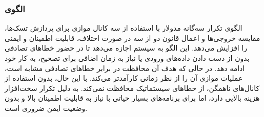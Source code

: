 \subsubsection{الگوی }
\label{archSafeTripModRedunSec}
\begin{RTL}
الگوی تکرار سه‌گانه مدولار  با استفاده از سه کانال
موازی برای پردازش تسک‌ها، مقایسه خروجی‌ها و اعمال قانون دو از سه
در صورت اختلاف، قابلیت اطمینان و ایمنی را افزایش می‌دهد. این الگو به
سیستم اجازه می‌دهد تا در حضور خطاهای تصادفی بدون از دست دادن داده‌های
ورودی یا نیاز به زمان اضافی برای تصحیح، به کار خود ادامه دهد.
در حالی که هدف آن محافظت در برابر خطاهای تصادفی مشابه
 است، عملیات موازی
 آن را از نظر زمانی کارآمدتر می‌کند.
با این حال، بدون استفاده از کانال‌های ناهمگن، از خطاهای سیستماتیک
محافظت نمی‌کند.  به دلیل تکرار سخت‌افزار هزینه بالایی دارد،
اما برای برنامه‌های بسیار حیاتی با نیاز به قابلیت اطمینان بالا
و بدون وضعیت ایمن ضروری است.
\end{RTL}